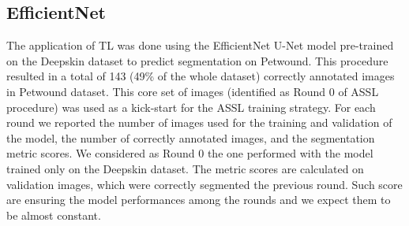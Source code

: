 \documentclass[../main.tex]{subfiles}
\begin{document}
\subsection{EfficientNet}
The application of TL was done using the EfficientNet U-Net model  pre-trained on the Deepskin dataset to predict segmentation on Petwound. This procedure resulted in a total of 143 (49\% of the whole dataset) correctly annotated images in Petwound dataset. 
This core set of images (identified as Round 0 of ASSL procedure) was used as a kick-start for the ASSL training strategy.
For each round we reported the number of images used for the training and validation of the model, the number of correctly annotated images, and the segmentation metric scores. We considered as Round 0 the one performed with the model trained only on the Deepskin dataset.
The metric scores are calculated on validation images, which were correctly segmented the previous round. 
Such score are ensuring the model performances among the rounds and we expect them to be almost constant.
\hspace{-1cm}
\begin{table}[H]
    \centering
    \caption{Results obtained by the EfficientNet model in the ASSL training strategy on the PetWound dataset. For each round we reported the number of images used for the training and validation of the model, the number of correctly annotated images, and the segmentation metric scores. 
    We considered as Round 0 the one performed with the model trained only on the Deepskin dataset.
    The metric scores are calculated on validation images, which were correctly segmented the previous round. 
Such score are ensuring the model performances among the rounds and we expect them to be almost constant.}
    \label{tab:results-eff-petwound}
\end{table}
\end{document}
